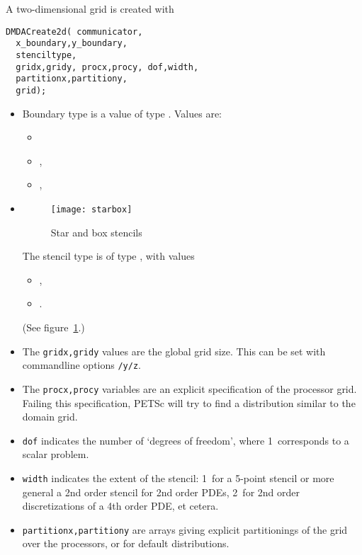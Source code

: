 A two-dimensional grid is created with 
\begin{lstlisting}
DMDACreate2d( communicator,
  x_boundary,y_boundary,
  stenciltype,
  gridx,gridy, procx,procy, dof,width, 
  partitionx,partitiony, 
  grid);
\end{lstlisting}
\begin{itemize}
\item
  Boundary type is a value of type .
  Values are:
  \begin{itemize}
  \item {}
  \item {},
  \item {},
  \end{itemize}
\item
  \begin{figure}[ht]
    \texttt{[image: starbox]}
    \caption{Star and box stencils}
    \label{fig:starbox}
  \end{figure}
  The stencil type is of type ,
  with values
  \begin{itemize}
  \item {},
  \item {}.
  \end{itemize}
  (See figure~\ref{fig:starbox}.)
\item
  The \lstinline{gridx,gridy} values are the global grid size.
  This can be set with commandline options
  \lstinline+/y/z+.
\item
  The \lstinline{procx,procy} variables are an explicit specification
  of the processor grid. Failing this specification, PETSc will try to
  find a distribution similar to the domain grid.
\item \lstinline{dof} indicates the number of `degrees of freedom',
  where 1~corresponds to a scalar problem.
\item \lstinline{width} indicates the extent of the stencil:
  1~for a 5-point stencil or more general a 2nd order stencil
  for 2nd order \acp{PDE},
  2~for 2nd order discretizations of a 4th order \ac{PDE}, et cetera.
\item \lstinline{partitionx,partitiony} are arrays
  giving explicit partitionings of the grid over the processors,
  or  for default distributions.
\end{itemize}

